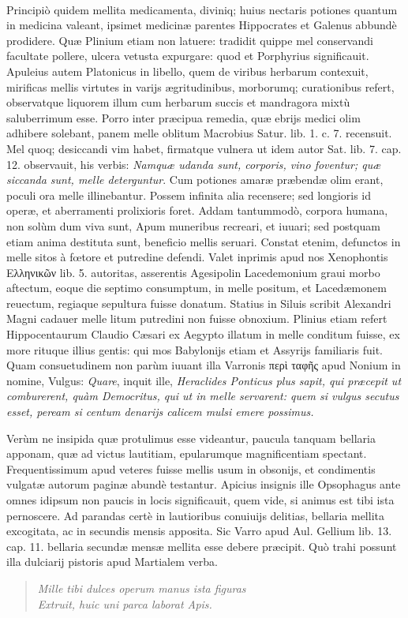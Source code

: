 \documentclass[a4paper, 11pt, oneside, polutonikogreek, latin]{article}
\begin{document}
\paragraph{}
Principiò quidem mellita medicamenta, diviniq; huius nectaris potiones quantum in medicina valeant, ipsimet medicinæ parentes Hippocrates et Galenus abbundè prodidere. Quæ Plinium etiam non latuere: tradidit quippe mel conservandi facultate pollere, ulcera vetusta expurgare: quod et Porphyrius significauit. Apuleius autem Platonicus in libello, quem de viribus herbarum contexuit, mirificas mellis virtutes in varijs ægritudinibus, morborumq; curationibus refert, observatque liquorem illum cum herbarum succis et mandragora mixtù saluberrimum esse. Porro inter præcipua remedia, quæ ebrijs medici olim adhibere solebant, panem melle oblitum Macrobius Satur. lib. 1. c. 7. recensuit. Mel quoq; desiccandi vim habet, firmatque vulnera ut idem autor Sat. lib. 7. cap. 12. observauit, his verbis: \emph{Namquæ udanda sunt, corporis, vino foventur; quæ siccanda sunt, melle deterguntur}. Cum potiones amaræ præbendæ olim erant, poculi ora melle illinebantur. Possem infinita alia recensere; sed longioris id operæ, et aberramenti prolixioris foret. Addam tantummodò, corpora humana, non solùm dum viva sunt, Apum muneribus recreari, et iuuari; sed postquam etiam anima destituta sunt, beneficio mellis seruari. Constat etenim, defunctos in melle sitos à fœtore et putredine defendi. Valet inprimis apud nos Xenophontis Ελληνικῶν lib. 5. autoritas, asserentis Agesipolin Lacedemonium graui morbo aftectum, eoque die septimo consumptum, in melle positum, et Lacedæmonem reuectum, regiaque sepultura fuisse donatum. Statius in Siluis scribit Alexandri Magni cadauer melle litum putredini non fuisse obnoxium. Plinius etiam refert Hippocentaurum Claudio Cæsari ex Aegypto illatum in melle conditum fuisse, ex more rituque illius gentis: qui mos Babylonijs etiam et Assyrijs familiaris fuit. Quam consuetudinem non parùm iuuant illa Varronis περὶ ταφῆς apud Nonium in nomine, Vulgus: \emph{Quare}, inquit ille, \emph{Heraclides Ponticus plus sapit, qui præcepit ut comburerent, quàm Democritus, qui ut in melle servarent: quem si vulgus secutus esset, peream si centum denarijs calicem mulsi emere possimus.}

Verùm ne insipida quæ protulimus esse videantur, paucula tanquam bellaria apponam, quæ ad victus lautitiam, epularumque magnificentiam spectant. Frequentissimum apud veteres fuisse mellis usum in obsonijs, et condimentis vulgatæ autorum paginæ abundè testantur. Apicius insignis ille Opsophagus ante omnes idipsum non paucis in locis significauit, quem vide, si animus est tibi ista pernoscere. Ad parandas certè in lautioribus conuiuijs delitias, bellaria mellita excogitata, ac in secundis mensis apposita. Sic Varro apud Aul. Gellium lib. 13. cap. 11. bellaria secundæ mensæ mellita esse debere præcipit. Quò trahi possunt illa dulciarij pistoris apud Martialem verba.
\begin{quote}
\emph{Mille tibi dulces operum manus ista figuras}\\
\hspace*{10mm}\emph{Extruit, huic uni parca laborat Apis.}\\
\end{quote}
\end{document}
